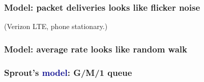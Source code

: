 \documentclass[svgnames]{beamer}
\begin{document}
\begin{frame}
\frametitle{\textbf{Model}: packet deliveries looks like flicker noise}

\begin{centering}

\def\svgwidth{0.7 \columnwidth}

\end{centering}

{\small (Verizon LTE, phone stationary.)}

\end{frame}

\begin{frame}
\frametitle{\textbf{Model}: average rate looks like random walk}

\begin{centering}

{\small
\def\svgwidth{\columnwidth}
}

\end{centering}

\end{frame}

\begin{frame}

\begin{centering}
\frametitle{Sprout's \textcolor{DarkBlue}{\bf model}: G/M/1 queue}
\def\svgwidth{\columnwidth}

\end{centering}



\end{frame}
\end{document}
